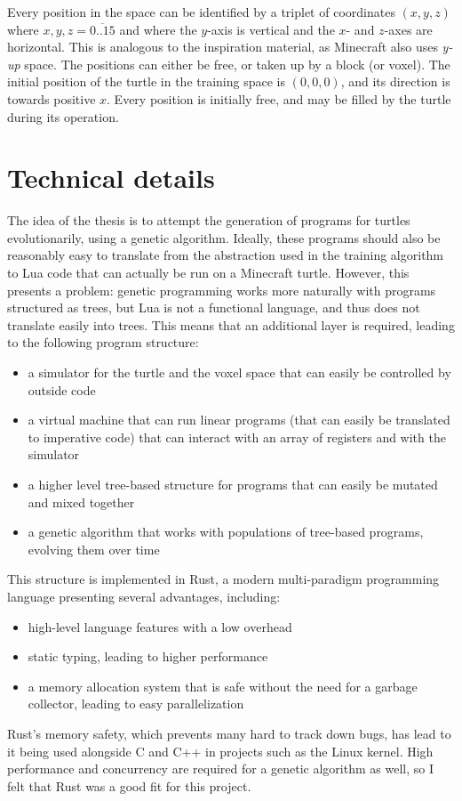 \documentclass{report}
\begin{document}
Every position in the space can be identified by a triplet of coordinates $(x, y, z)$ where $x, y, z = \overline{0..15}$ and where the $y$-axis is vertical and the $x$- and $z$-axes are horizontal. This is analogous to the inspiration material, as Minecraft also uses \emph{y-up} space. The positions can either be free, or taken up by a block (or voxel). The initial position of the turtle in the training space is $(0, 0, 0)$, and its direction is towards positive $x$. Every position is initially free, and may be filled by the turtle during its operation.

\chapter{Technical details}
The idea of the thesis is to attempt the generation of programs for turtles evolutionarily, using a genetic algorithm. Ideally, these programs should also be reasonably easy to translate from the abstraction used in the training algorithm to Lua code that can actually be run on a Minecraft turtle. However, this presents a problem: genetic programming works more naturally with programs structured as trees, but Lua is not a functional language, and thus does not translate easily into trees. This means that an additional layer is required, leading to the following program structure:

\begin{itemize}
    \item a simulator for the turtle and the voxel space that can easily be controlled by outside code
    \item a virtual machine that can run linear programs (that can easily be translated to imperative code) that can interact with an array of registers and with the simulator
    \item a higher level tree-based structure for programs that can easily be mutated and mixed together
    \item a genetic algorithm that works with populations of tree-based programs, evolving them over time
\end{itemize}

This structure is implemented in Rust, a modern multi-paradigm programming language presenting several advantages, including:
\begin{itemize}
    \item high-level language features with a low overhead
    \item static typing, leading to higher performance
    \item a memory allocation system that is safe without the need for a garbage collector, leading to easy parallelization
\end{itemize}
Rust's memory safety, which prevents many hard to track down bugs, has lead to it being used alongside C and C++ in projects such as the Linux kernel. High performance and concurrency are required for a genetic algorithm as well, so I felt that Rust was a good fit for this project.
\end{document}
